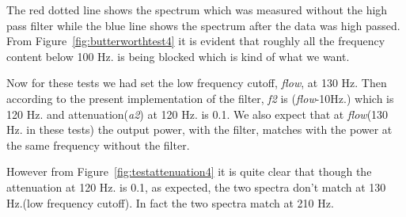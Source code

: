 The red dotted line shows the spectrum which was measured without
the high pass filter while the blue line shows the spectrum after the data was 
high passed. From Figure~\ref{fig:butterworthtest4} 
it is evident that roughly all the frequency content below 100 Hz. is being
blocked which is kind of what we want. 

Now for these tests we had set the low frequency cutoff, \emph{flow}, at 130 Hz.
Then according to the present implementation of the filter, \emph{f2} is 
(\emph{flow}-10Hz.) which is 120 Hz. and attenuation(\emph{a2}) 
at 120 Hz. is 0.1. We also expect that at \emph{flow}(130 Hz. in these tests) 
the output power, with the filter, matches with the power at the same frequency 
without the filter.

However from Figure~\ref{fig:testattenuation4} it is quite clear that though 
the attenuation  at 120 Hz. is 0.1, as expected, the two spectra don't match 
at 130 Hz.(low frequency cutoff). In fact the two spectra match at 210 Hz.

